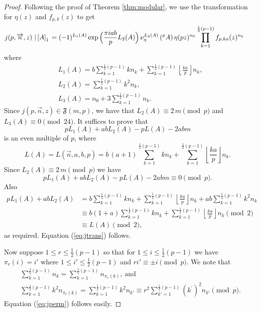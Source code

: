 \documentclass[12pt]{amsart}
\theoremstyle{definition}
\theoremstyle{remark}
\numberwithin{equation}{section}
\newcommand\Lpar[1]{\left(#1\right)}
\newcommand\FL[1]{\left\lfloor#1\right\rfloor}
\newcommand\stroke[3]{#1\,\left\arrowvert\,\left[#2\right]_{#3}\right.}
\newcommand\thm[1]{\ref{thm:#1}}
\newcommand\eqn[1]{(\ref{eq:#1})}
\begin{document}
\begin{proof}
Following the proof of Theorem \thm{modular}, we use the transformation for $\eta(z)$ and $f_{p,k}(z)$ to get
\begin{align*}
j(p,\overrightarrow{n},z)\stroke{}{A}{1}&=(-1)^{L_1(A)}\exp\Big(\dfrac{\pi i a b}{p}L_2(A)\Big)\,\nu_{\eta}^{L_3(A)}\Lpar{{}^pA}\eta(pz)^{n_0}\prod_{k=1}^{\frac{1}{2}(p-1)}f_{p,ka}(z)^{n_k}
\end{align*}
where
\begin{align*}
&L_1(A)=b\sum_{k=1}^{\frac{1}{2}(p-1)}kn_k+\sum_{k=1}^{\frac{1}{2}(p-1)}\FL{\frac{ka}{p}} n_k,
\\
&L_2(A)=\sum_{k=1}^{\frac{1}{2}(p-1)}k^2n_k,
\\
&L_3(A)=n_0+3\sum_{k=1}^{\frac{1}{2}(p-1)}n_k.
\end{align*}
Since $j(p,\overrightarrow{n},z) \in \mathfrak{F}(m,p)$, we have that 
$L_2(A)\equiv 2\,m \pmod{p}$ and $L_3(A)\equiv 0 \pmod{24}$.  
It suffices to prove that 
$$
pL_{1}(A)+{ab} L_2(A) - p L(A) - 2abm 
$$
is an even multiple of $p$, where
$$
L(A) = 
L(\overrightarrow{n},a,b,p)=b\,(a+1)\sum\limits_{k=1}^{\frac{1}{2}(p-1)}kn_{k}+\sum\limits_{k=1}^{\frac{1}{2}(p-1)}\FL{\frac{ka}{p}} n_{k}. 
$$
Since $L_2(A) \equiv 2\,m\pmod{p}$
we have
$$
pL_{1}(A)+{ab} L_2(A) - p L(A) - 2abm  \equiv 0 \pmod{p}.
$$
Also 
\begin{align*}
pL_{1}(A)+abL_2(A)
    &=b\sum_{k=1}^{\frac{1}{2}(p-1)}kn_{k}
       +\sum_{k=1}^{\frac{1}{2}(p-1)}\FL{\frac{ka}{p}} n_{k}
       +ab\sum_{k=1}^{\frac{1}{2}(p-1)}k^2n_{k}
\\
&\equiv b(1+a)\sum_{k=1}^{\frac{1}{2}(p-1)}kn_{k}
  +\sum_{k=1}^{\frac{1}{2}(p-1)}\FL{\frac{ka}{p}} n_{k} \pmod{2}\\
&\equiv L(A) \pmod{2},
\end{align*}
as required.  Equation \eqn{jtrans} follows.

Now suppose $1 \le r \le \frac{1}{2}(p-1)$ so that for $1 \le i \le \frac{1}{2}(p-1)$
we have
$\pi_r(i) = i'$ where $1 \le i'\le \frac{1}{2}(p-1)$ and $ri' \equiv\pm i \pmod{p}$.
We note that
\begin{align*}
&\sum_{k=1}^{\frac{1}{2}(p-1)}n_k=\sum_{k=1}^{\frac{1}{2}(p-1)}n_{\pi_r(k)},~\text{and}\\
&\sum_{k=1}^{\frac{1}{2}(p-1)}k^2 n_{\pi_r(k)}=\sum_{k=1}^{\frac{1}{2}(p-1)}k^2 n_{k'} \equiv r^2\sum_{k'=1}^{\frac{1}{2}(p-1)}(k^{'})^2n_{k'} \pmod {p}.
\end{align*}
Equation \eqn{jperm} follows easily.
\end{proof}
\end{document}
